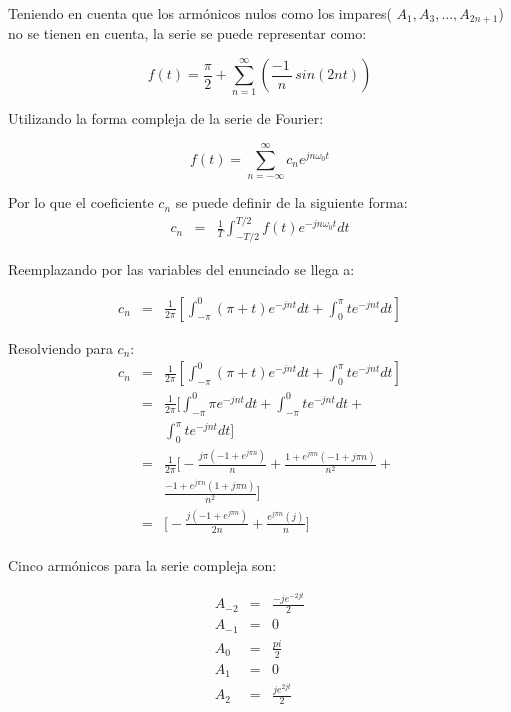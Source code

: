 \documentclass[a4paper]{article}
\begin{document}
Teniendo en cuenta que los armónicos nulos como los impares( $A_1 , A_3,..., A_{2n+1}$) no se tienen en cuenta, la serie se puede representar como:

$$f(t) = \frac{\pi}{2} + \sum_{n=1}^\infty\left( \frac{ -1 \,}{n} \,sin(2 n t) \right)$$


Utilizando la forma compleja de la serie de Fourier:


$$f(t) =  \sum_{n=-\infty}^\infty c_n e^{jn\omega_0t} $$


Por lo que el coeficiente $c_n$ se puede definir de la siguiente forma:
\begin{eqnarray*}
c_n &=& \frac{1}{T}\int_{-T/2}^{T/2}f(t)e^{-jn\omega_0t}dt
\end{eqnarray*}

Reemplazando por las variables del enunciado se llega a:

\begin{eqnarray*}
c_n &=& \frac{1}{2\pi} \left [ \int_{-\pi}^{0}(\pi+t) e^{-jnt}dt + \int_{0}^{\pi}t e^{-jnt}dt \right]
\end{eqnarray*}

Resolviendo para $c_n$:
\begin{eqnarray*}
c_n &=& \frac{1}{2\pi} \left [ \int_{-\pi}^{0}(\pi+t) e^{-jnt}dt + \int_{0}^{\pi}t e^{-jnt}dt \right]\\
&=& \frac{1}{2\pi} \bigg [ \int_{-\pi}^{0}\pi e^{-jnt}dt + \int_{-\pi}^{0}t e^{-jnt}dt + \\
& &  \int_{0}^{\pi}t e^{-jnt}dt \bigg] \\
&=& \frac{1}{2\pi} \bigg [ -\frac{j \pi (-1 + e^{j \pi n})}{n} + \frac{1+e^{j \pi n}(-1 + j \pi n)}{n^2} + \\
& &  \frac{-1+e^{j \pi n}(1 + j \pi n)}{n^2} \bigg] \\
&=& \bigg [ -\frac{j (-1 + e^{j \pi n})}{2n} + \frac{e^{j \pi n}(j)}{ n} \bigg]\\
\end{eqnarray*}

Cinco armónicos para la serie compleja son:

\begin{eqnarray*}
A_{-2} &=& \frac{-j e^{-2 j t}}{2} \\
A_{-1} &=& 0 \\
A_0 &=& \frac{pi}{2} \\
A_1 &=& 0 \\
A_2 &=& \frac{j e^{2 j t}}{2} \\
\end{eqnarray*}
\end{document}
